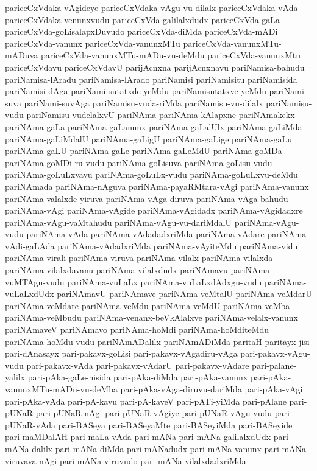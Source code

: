 {pariceCxVdaka-vAgideye
pariceCxVdaka-vAgu-vu-dilalx
pariceCxVdaka-vAda
pariceCxVdaka-venunxvudu
pariceCxVda-galilalxdudx
pariceCxVda-gaLa
pariceCxVda-goLisalapxDuvudo
pariceCxVda-diMda
pariceCxVda-mADi
pariceCxVda-vanunx
pariceCxVda-vanunxMTu
pariceCxVda-vanunxMTu-mADuva
pariceCxVda-vanunxMTu-mADu-vu-deMdu
pariceCxVda-vanunxMtu
pariceCxVdavu
pariceCxVdavU
parijAcnxna
parijAcnxnavu
pariNamisa-bahudu
pariNamisa-lAradu
pariNamisa-lArado
pariNamisi
pariNamisitu
pariNamisida
pariNamisi-dAga
pariNami-sutatxde-yeMdu
pariNamisutatxve-yeMdu
pariNami-suva
pariNami-suvAga
pariNamisu-vuda-riMda
pariNamisu-vu-dilalx
pariNamisu-vudu
pariNamisu-vudelalxvU
pariNAma
pariNAma-kAlapxne
pariNAmakekx
pariNAma-gaLa
pariNAma-gaLanunx
pariNAma-gaLalUlx
pariNAma-gaLiMda
pariNAma-gaLiMdalU
pariNAma-gaLigU
pariNAma-gaLige
pariNAma-gaLu
pariNAma-gaLU
pariNAma-gaLe
pariNAma-gaLeMdU
pariNAma-goMDa
pariNAma-goMDi-ru-vudu
pariNAma-goLisuva
pariNAma-goLisu-vudu
pariNAma-goLuLxvavu
pariNAma-goLuLx-vudu
pariNAma-goLuLxvu-deMdu
pariNAmada
pariNAma-nAguva
pariNAma-payaRMtara-vAgi
pariNAma-vanunx
pariNAma-valalxde-yiruva
pariNAma-vAga-diruva
pariNAma-vAga-bahudu
pariNAma-vAgi
pariNAma-vAgide
pariNAma-vAgidadx
pariNAma-vAgidadxre
pariNAma-vAgu-vaMtahudu
pariNAma-vAgu-vu-dariMdalU
pariNAma-vAgu-vudu
pariNAma-vAda
pariNAma-vAdadadxriMda
pariNAma-vAdare
pariNAma-vAdi-gaLAda
pariNAma-vAdadxriMda
pariNAma-vAyiteMdu
pariNAma-vidu
pariNAma-virali
pariNAma-viruva
pariNAma-vilalx
pariNAma-vilalxda
pariNAma-vilalxdavanu
pariNAma-vilalxdudx
pariNAmavu
pariNAma-vuMTAgu-vudu
pariNAma-vuLaLx
pariNAma-vuLaLxdAdxgu-vudu
pariNAma-vuLaLxdUdx
pariNAmavU
pariNAmave
pariNAma-veMtalU
pariNAma-veMdarU
pariNAma-veMdare
pariNAma-veMdu
pariNAma-veMdU
pariNAma-veMba
pariNAma-veMbudu
pariNAma-venanx-beVkAlalxve
pariNAma-velalx-vanunx
pariNAmaveV
pariNAmavo
pariNAma-hoMdi
pariNAma-hoMditeMdu
pariNAma-hoMdu-vudu
pariNAmADalilx
pariNAmADiMda
paritaH
paritayx-jisi
pari-dAnasayx
pari-pakavx-goLisi
pari-pakavx-vAgadiru-vAga
pari-pakavx-vAgu-vudu
pari-pakavx-vAda
pari-pakavx-vAdarU
pari-pakavx-vAdare
pari-palane-yalilx
pari-pAka-gaLe-nisida
pari-pAka-diMda
pari-pAka-vanunx
pari-pAka-vanunxMTu-mADu-vu-deMba
pari-pAka-vAga-diruvu-dariMda
pari-pAka-vAgi
pari-pAka-vAda
pari-pA-kavu
pari-pA-kaveV
pari-pATi-yiMda
pari-pAlane
pari-pUNaR
pari-pUNaR-nAgi
pari-pUNaR-vAgiye
pari-pUNaR-vAgu-vudu
pari-pUNaR-vAda
pari-BASeya
pari-BASeyaMte
pari-BASeyiMda
pari-BASeyide
pari-maMDalAH
pari-maLa-vAda
pari-mANa
pari-mANa-galilalxdUdx
pari-mANa-dalilx
pari-mANa-diMda
pari-mANadudx
pari-mANa-vanunx
pari-mANa-viruvava-nAgi
pari-mANa-viruvudo
pari-mANa-vilalxdadxriMda
}

